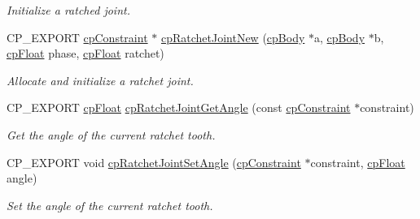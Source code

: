 \begin{DoxyCompactItemize}
\begin{DoxyCompactList}\small\item\em Initialize a ratched joint. \end{DoxyCompactList}\item 
\mbox{\label{group__cp_ratchet_joint_ga72f82de2e00e290ca10bd7838d86fb08}} 
C\+P\+\_\+\+E\+X\+P\+O\+RT \mbox{\hyperlink{structcp_constraint}{cp\+Constraint}} $\ast$ \mbox{\hyperlink{group__cp_ratchet_joint_ga72f82de2e00e290ca10bd7838d86fb08}{cp\+Ratchet\+Joint\+New}} (\mbox{\hyperlink{structcp_body}{cp\+Body}} $\ast$a, \mbox{\hyperlink{structcp_body}{cp\+Body}} $\ast$b, \mbox{\hyperlink{group__basic_types_gac1ed65573e035bf892505768c852d8d3}{cp\+Float}} phase, \mbox{\hyperlink{group__basic_types_gac1ed65573e035bf892505768c852d8d3}{cp\+Float}} ratchet)
\begin{DoxyCompactList}\small\item\em Allocate and initialize a ratchet joint. \end{DoxyCompactList}\item 
\mbox{\label{group__cp_ratchet_joint_gafa3aadeeff9c829c323c136b3778e4b5}} 
C\+P\+\_\+\+E\+X\+P\+O\+RT \mbox{\hyperlink{group__basic_types_gac1ed65573e035bf892505768c852d8d3}{cp\+Float}} \mbox{\hyperlink{group__cp_ratchet_joint_gafa3aadeeff9c829c323c136b3778e4b5}{cp\+Ratchet\+Joint\+Get\+Angle}} (const \mbox{\hyperlink{structcp_constraint}{cp\+Constraint}} $\ast$constraint)
\begin{DoxyCompactList}\small\item\em Get the angle of the current ratchet tooth. \end{DoxyCompactList}\item 
\mbox{\label{group__cp_ratchet_joint_gaec8e1e9ed802b4e042a2901cb83fa6a8}} 
C\+P\+\_\+\+E\+X\+P\+O\+RT void \mbox{\hyperlink{group__cp_ratchet_joint_gaec8e1e9ed802b4e042a2901cb83fa6a8}{cp\+Ratchet\+Joint\+Set\+Angle}} (\mbox{\hyperlink{structcp_constraint}{cp\+Constraint}} $\ast$constraint, \mbox{\hyperlink{group__basic_types_gac1ed65573e035bf892505768c852d8d3}{cp\+Float}} angle)
\begin{DoxyCompactList}\small\item\em Set the angle of the current ratchet tooth. \end{DoxyCompactList}\item 
\mbox{\label{group__cp_ratchet_joint_ga7375d4a050643c7ae9c33425ccd5e88c}} 

\end{DoxyCompactItemize}

